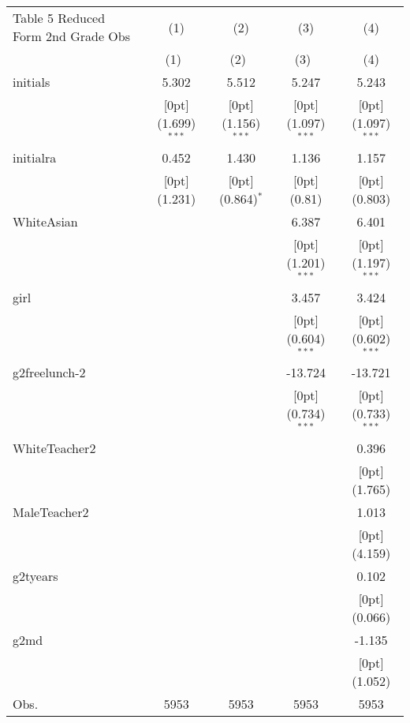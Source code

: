 \documentclass[a4paper,11pt]{article}
\begin{document}
	
\begin{table}
	\small
\begin{tabular*}{\textwidth}{@{\extracolsep{\fill}}lcccc}				
	Table 5 Reduced Form 2nd Grade Obs & \multicolumn{1}{c}{(1)} &	\multicolumn{1}{c}{(2)} &	\multicolumn{1}{c}{(3)} &	\multicolumn{1}{c}{(4)} \\
	\cline{2-5}				
	& \multicolumn{1}{c}{(1)\mbox{\ }} &	\multicolumn{1}{c}{(2)\mbox{\ }} &	\multicolumn{1}{c}{(3)\mbox{\ }} &	\multicolumn{1}{c}{(4)} \\
	\hline				
	initials &	5.302 &	5.512 &	5.247 &	5.243 \\
	&	\raisebox{.7ex}[0pt]{\scriptsize (1.699)$^{***}$} &	\raisebox{.7ex}[0pt]{\scriptsize (1.156)$^{***}$} &	\raisebox{.7ex}[0pt]{\scriptsize (1.097)$^{***}$} &	\raisebox{.7ex}[0pt]{\scriptsize (1.097)$^{***}$} \\
	initialra &	0.452 &	1.430 &	1.136 &	1.157 \\
	&	\raisebox{.7ex}[0pt]{\scriptsize (1.231)} &	\raisebox{.7ex}[0pt]{\scriptsize (0.864)$^{*}$} &	\raisebox{.7ex}[0pt]{\scriptsize (0.81)} &	\raisebox{.7ex}[0pt]{\scriptsize (0.803)} \\
	WhiteAsian &	&	&	6.387 &	6.401 \\
	&	&	&	\raisebox{.7ex}[0pt]{\scriptsize (1.201)$^{***}$} &	\raisebox{.7ex}[0pt]{\scriptsize (1.197)$^{***}$} \\
	girl &	&	&	3.457 &	3.424 \\
	&	&	&	\raisebox{.7ex}[0pt]{\scriptsize (0.604)$^{***}$} &	\raisebox{.7ex}[0pt]{\scriptsize (0.602)$^{***}$} \\
	g2freelunch-2 &	&	&	-13.724 &	-13.721 \\
	&	&	&	\raisebox{.7ex}[0pt]{\scriptsize (0.734)$^{***}$} &	\raisebox{.7ex}[0pt]{\scriptsize (0.733)$^{***}$} \\
	WhiteTeacher2 &	&	&	&	0.396 \\
	&	&	&	&	\raisebox{.7ex}[0pt]{\scriptsize (1.765)} \\
	MaleTeacher2 &	&	&	&	1.013 \\
	&	&	&	&	\raisebox{.7ex}[0pt]{\scriptsize (4.159)} \\
	g2tyears &	&	&	&	0.102 \\
	&	&	&	&	\raisebox{.7ex}[0pt]{\scriptsize (0.066)} \\
	g2md &	&	&	&	-1.135 \\
	&	&	&	&	\raisebox{.7ex}[0pt]{\scriptsize (1.052)} \\
	Obs. &	5953 &	5953 &	5953 &	5953 \\
	\hline\hline				
\end{tabular*}
\end{table}	
\end{document}
